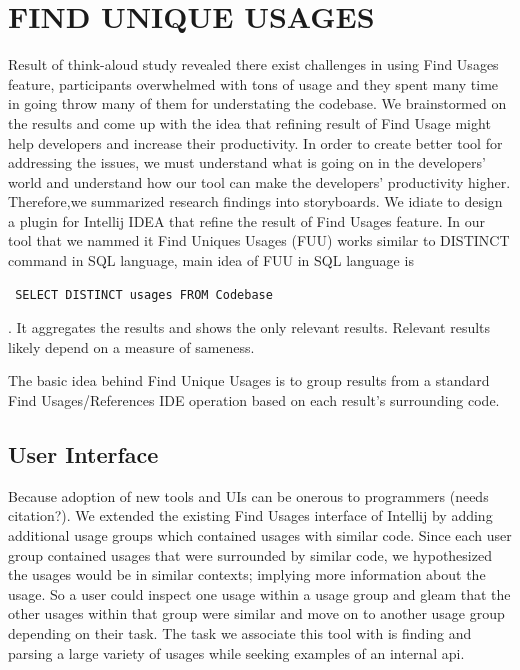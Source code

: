\documentclass[conference]{IEEEtran}
\begin{document}
\section{FIND UNIQUE USAGES}
Result of think-aloud study  revealed there exist challenges in using Find Usages feature, participants overwhelmed with tons of usage and they spent many time in going throw many of them for understating the codebase. We brainstormed on the results and come up with the idea that refining result of Find Usage might help developers and increase their productivity. In order to create better tool for addressing the issues, we must understand what is going on in the developers' world and understand how our tool can make the developers' productivity higher. Therefore,we summarized research findings into storyboards. We idiate to design a plugin for Intellij IDEA that refine the result of Find Usages feature. In our tool that we nammed it Find Uniques Usages (FUU) works similar to DISTINCT command in SQL language, main idea of FUU in SQL language is \begin{verbatim} SELECT DISTINCT usages FROM Codebase \end{verbatim}. It aggregates the results and shows the only relevant results. Relevant results likely depend on a measure of sameness.




The basic idea behind Find Unique Usages is to group results from a standard Find Usages/References IDE operation based on each result's surrounding code.



\subsection{User Interface} %
Because adoption of new tools and UIs can be onerous to programmers (needs citation?). We extended the existing Find Usages interface of Intellij by adding additional usage groups which contained usages with similar code. Since each user group contained usages that were surrounded by similar code, we hypothesized the usages would be in similar contexts; implying more information about the usage. So a user could inspect one usage within a usage group and gleam that the other usages within that group were similar and move on to another usage group depending on their task. The task we associate this tool with is finding and parsing a large variety of usages while seeking examples of an internal api.
\end{document}
